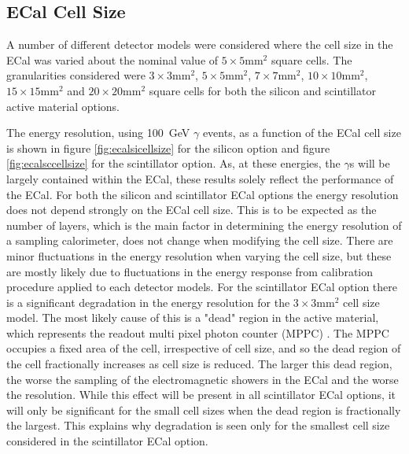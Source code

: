 
\subsection{ECal Cell Size}
\label{sec:ecalcells}
A number of different detector models were considered where the cell size in the ECal was varied about the nominal value of $5 \times 5 \text{mm}^{2}$ square cells.  The granularities considered were $3 \times 3 \text{mm}^{2}$, $5 \times 5 \text{mm}^{2}$, $7 \times 7 \text{mm}^{2}$, $10 \times 10 \text{mm}^{2}$, $15 \times 15 \text{mm}^{2}$ and $20 \times 20 \text{mm}^{2}$ square cells for both the silicon and scintillator active material options.  

The energy resolution, using 100~GeV $\gamma$ events, as a function of the ECal cell size is shown in figure \ref{fig:ecalsicellsize} for the silicon option and figure \ref{fig:ecalsccellsize} for the scintillator option.  As, at these energies, the $\gamma$s will be largely contained within the ECal, these results solely reflect the performance of the ECal.  For both the silicon and scintillator ECal options the energy resolution does not depend strongly on the ECal cell size.  This is to be expected as the number of layers, which is the main factor in determining the energy resolution of a sampling calorimeter, does not change when modifying the cell size.  There are minor fluctuations in the energy resolution when varying the cell size, but these are mostly likely due to fluctuations in the energy response from calibration procedure applied to each detector models.  For the scintillator ECal option there is a significant degradation in the energy resolution for the $3 \times 3 \text{mm}^{2}$ cell size model.  The most likely cause of this is a "dead" region in the active material, which represents the readout multi pixel photon counter (MPPC) \cite{arXiv:1006.3396}.  The MPPC occupies a fixed area of the cell, irrespective of cell size, and so the dead region of the cell fractionally increases as cell size is reduced.  The larger this dead region, the worse the sampling of the electromagnetic showers in the ECal and the worse the resolution.  While this effect will be present in all scintillator ECal options, it will only be significant for the small cell sizes when the dead region is fractionally the largest.  This explains why degradation is seen only for the smallest cell size considered in the scintillator ECal option.     

